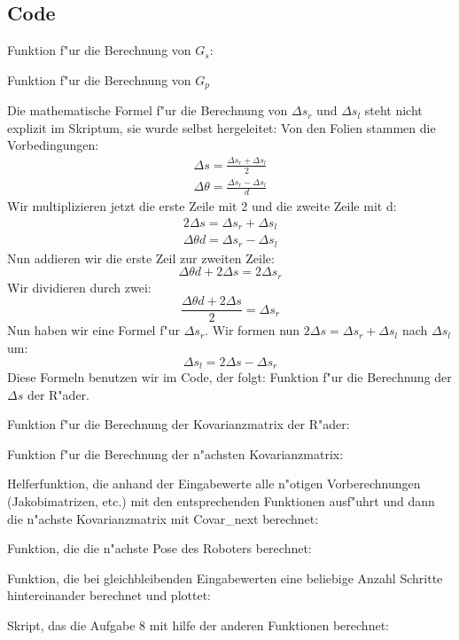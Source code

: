 \documentclass[11pt]{article}
\begin{document}
    \subsection{Code}\label{subsec:code}
    Funktion f"ur die Berechnung von $G_{s}$:
    
    Funktion f"ur die Berechnung von $G_{p}$
    
    Die mathematische Formel f"ur die Berechnung von $\Delta s_{r}$ und $\Delta s_{l}$ steht nicht explizit im Skriptum, sie wurde selbst hergeleitet:
    Von den Folien stammen die Vorbedingungen:
    \begin{equation}
        \begin{aligned}
            \Delta s = \frac{\Delta s_{r} + \Delta s_{l}}{2} \\
            \Delta \theta = \frac{\Delta s_{r} - \Delta s_{l}}{d}
        \end{aligned}
    \end{equation}
    Wir multiplizieren jetzt die erste Zeile mit 2 und die zweite Zeile mit d:
    \begin{equation}
        \begin{aligned}
            2\Delta s = \Delta s_{r} + \Delta s_{l} \\
            \Delta \theta d = \Delta s_{r} - \Delta s_{l}
        \end{aligned}
    \end{equation}
    Nun addieren wir die erste Zeil zur zweiten Zeile:
    \begin{equation}
        \Delta \theta d + 2\Delta s = 2\Delta s_{r}
    \end{equation}
    Wir dividieren durch zwei:
    \begin{equation}
        \frac{\Delta \theta d + 2\Delta s}{2} = \Delta s_{r}
    \end{equation}
    Nun haben wir eine Formel f"ur $\Delta s_{r}$.
    Wir formen nun $2\Delta s = \Delta s_{r} + \Delta s_{l}$ nach $\Delta s_{l}$ um:
    \begin{equation}
        \Delta s_{l} = 2\Delta s - \Delta s_{r}
    \end{equation}
    Diese Formeln benutzen wir im Code, der folgt:
    Funktion f"ur die Berechnung der $\Delta s$ der R"ader.
    
    Funktion f"ur die Berechnung der Kovarianzmatrix der R"ader:
    
    Funktion f"ur die Berechnung der n"achsten Kovarianzmatrix:
    
    Helferfunktion, die anhand der Eingabewerte alle n"otigen Vorberechnungen (Jakobimatrizen, etc.) mit den entsprechenden Funktionen ausf"uhrt und dann die n"achste Kovarianzmatrix mit Covar\_next berechnet:
    
    Funktion, die die n"achste Pose des Roboters berechnet:
    
    Funktion, die bei gleichbleibenden Eingabewerten eine beliebige Anzahl Schritte hintereinander berechnet und plottet:
    
    Skript, das die Aufgabe 8 mit hilfe der anderen Funktionen berechnet:
    
\end{document}
